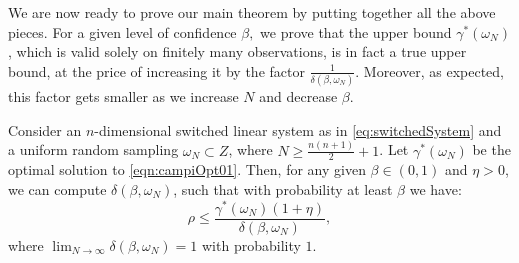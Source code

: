 We are now ready to prove our main theorem by putting together all the above pieces. For a given level of confidence $\beta,$ we prove that the upper bound $\gamma^*(\omega_N)$, which is valid solely on finitely many observations, is in fact a true upper bound, at the price of increasing it by the factor $\frac{1}{\delta(\beta, \omega_N)}$. Moreover, as expected, this factor gets smaller as we increase $N$ and decrease $\beta$.

\begin{theorem}\label{thm:mainTheorem}Consider an $n$-dimensional switched linear system as in \eqref{eq:switchedSystem} and a uniform random sampling $\omega_N \subset Z$, where $N \geq \frac{n(n+1)}{2}+1$. Let $\gamma^*(\omega_N) $ be the optimal solution to \eqref{eqn:campiOpt01}. Then, for any given $\beta \in (0,1)$ and $\eta > 0$, we can compute $\delta(\beta, \omega_N)$, such that with probability at least $\beta$ we have:
$$\rho \leq \frac{\gamma^*(\omega_N) (1+ \eta)}{\delta(\beta, \omega_N)},$$
where $\lim_{N \to \infty}\delta(\beta, \omega_N) = 1$ with probability $1$.
\end{theorem}

